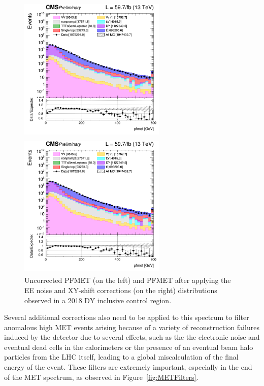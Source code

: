 \documentclass[a4paper, 10pt, openright]{report}
\begin{document}
\begin{figure}[htbp]
\centering
\begin{minipage}[b]{.49\textwidth}
\includegraphics[width=7cm, height=7cm]{figs/log_cratio_inclusiveCR_ll_pfmet_2018.png}
\end{minipage}\hfill
\begin{minipage}[b]{.49\textwidth}
\includegraphics[width=7cm, height=7cm]{figs/log_cratio_inclusiveCR_ll_METcorrected_pt_2018.png}
\end{minipage} \hfill
\caption{Uncorrected PFMET (on the left) and PFMET after applying the EE noise and XY-shift corrections (on the right) distributions observed in a 2018 \ac{DY} inclusive control region.}
\label{fig:metCorrEffect}
\end{figure}

Several additional corrections also need to be applied to this spectrum to filter anomalous high \ac{MET} events arising because of a variety of reconstruction failures induced by the detector due to several effects, such as the the electronic noise and eventual dead cells in the calorimeters or the presence of an eventual beam halo particles from the \ac{LHC} itself, leading to a global miscalculation of the final energy of the event. These filters are extremely important, especially in the end of the \ac{MET} spectrum, as observed in Figure~\ref{fig:METFilters}.
\end{document}
